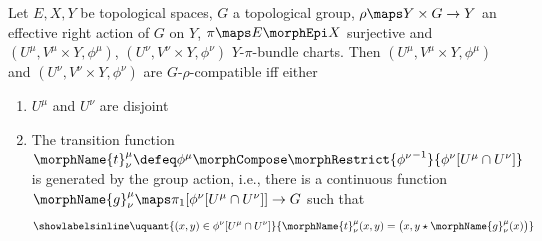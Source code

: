 \documentclass{article}
\begin{document}
\begin{definition}
\label{def:Grho-compat}
Let $E,X,Y$ be topological spaces, $G$ a topological group,
$\rho \maps Y \times G \to Y$ an effective right action of
$G$ on $Y$, $\pi \maps E \morphEpi X$ surjective
and $(U^\mu, V^\mu \times Y, \phi^\mu)$,
$(U^\nu, V^\nu \times Y, \phi^\nu)$ $Y$-$\pi$-bundle charts. Then
$(U^\mu, V^\mu \times Y, \phi^\mu)$ and
$(U^\nu, V^\nu \times Y, \phi^\nu)$ are $G$-$\rho$-compatible iff either
\begin{enumerate}
\item $U^\mu$ and $U^\nu$ are disjoint
\item
The transition function
$
  \morphName{t}^\mu_\nu \defeq
    \phi^\mu \morphCompose
    \morphRestrict{{\phi^\nu}^{-1}}{\phi^\nu[U^\mu \cap U^\nu]}
$
is generated by the group action, i.e., there is a continuous function
$\morphName{g}^\mu_\nu \maps \pi_1[\phi^\nu[U^\mu \cap U^\nu]] \to G$
such that
\begin{equation}
\showlabelsinline
\label{eq:transitiongroup}
\uquant
  {{(x,y) \in \phi^\nu[U^\mu \cap U^\nu]}}
  {
    \morphName{t}^\mu_\nu(x,y) =
    \bigl ( x, y \star \morphName{g}^\mu_\nu(x) \bigr )
  }
\end{equation}
\end{enumerate}
\end{definition}
\end{document}
